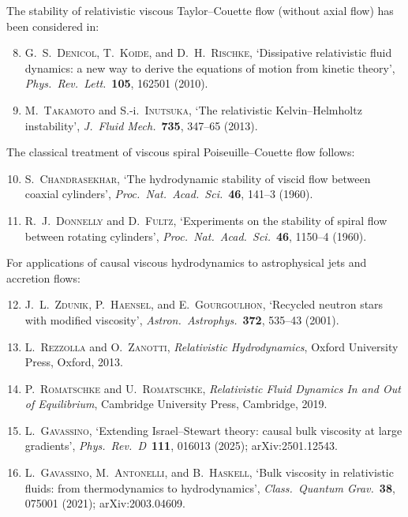 \noindent The stability of relativistic viscous Taylor--Couette flow
(without axial flow) has been considered in:

\begin{enumerate}\setcounter{enumi}{7}
\item G.~S.~\textsc{Denicol}, T.~\textsc{Koide}, and
  D.~H.~\textsc{Rischke},
  `Dissipative relativistic fluid dynamics: a new way to derive
  the equations of motion from kinetic theory',
  \emph{Phys.\ Rev.\ Lett.}\ \textbf{105}, 162501 (2010).

\item M.~\textsc{Takamoto} and S.-i.~\textsc{Inutsuka},
  `The relativistic Kelvin--Helmholtz instability',
  \emph{J.\ Fluid Mech.}\ \textbf{735}, 347--65 (2013).
\end{enumerate}

\noindent The classical treatment of viscous spiral
Poiseuille--Couette flow follows:

\begin{enumerate}\setcounter{enumi}{9}
\item S.~\textsc{Chandrasekhar},
  `The hydrodynamic stability of viscid flow between coaxial
  cylinders',
  \emph{Proc.\ Nat.\ Acad.\ Sci.}\ \textbf{46}, 141--3 (1960).

\item R.~J.~\textsc{Donnelly} and D.~\textsc{Fultz},
  `Experiments on the stability of spiral flow between rotating
  cylinders',
  \emph{Proc.\ Nat.\ Acad.\ Sci.}\ \textbf{46}, 1150--4 (1960).
\end{enumerate}

\noindent For applications of causal viscous hydrodynamics
to astrophysical jets and accretion flows:

\begin{enumerate}\setcounter{enumi}{11}
\item J.~L.~\textsc{Zdunik}, P.~\textsc{Haensel}, and
  E.~\textsc{Gourgoulhon},
  `Recycled neutron stars with modified viscosity',
  \emph{Astron.\ Astrophys.}\ \textbf{372}, 535--43 (2001).

\item L.~\textsc{Rezzolla} and O.~\textsc{Zanotti},
  \emph{Relativistic Hydrodynamics},
  Oxford University Press, Oxford, 2013.

\item P.~\textsc{Romatschke} and U.~\textsc{Romatschke},
  \emph{Relativistic Fluid Dynamics In and Out of Equilibrium},
  Cambridge University Press, Cambridge, 2019.

\item L.~\textsc{Gavassino}, `Extending Israel--Stewart theory: causal
  bulk viscosity at large gradients',
  \emph{Phys.\ Rev.\ D}\ \textbf{111}, 016013 (2025);
  arXiv:2501.12543.

\item L.~\textsc{Gavassino}, M.~\textsc{Antonelli}, and
  B.~\textsc{Haskell}, `Bulk viscosity in relativistic fluids: from
  thermodynamics to hydrodynamics',
  \emph{Class.\ Quantum Grav.}\ \textbf{38}, 075001 (2021);
  arXiv:2003.04609.
\end{enumerate}

